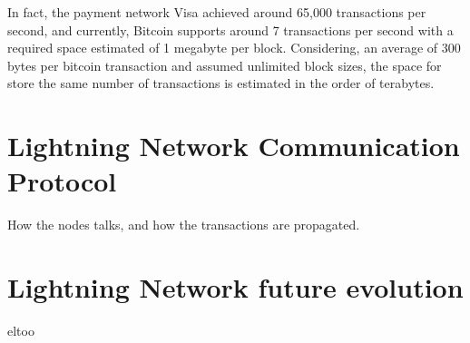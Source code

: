 In fact, the payment network Visa achieved around 65,000\cite{visa-sheet} transactions per second, and currently,
Bitcoin supports around 7 transactions per second with a required space estimated of 1 megabyte per block. Considering,
an average of 300 bytes per bitcoin transaction and assumed unlimited block sizes, the space for store the same number
of transactions is estimated in the order of terabytes\cite{lightning-network-paper}.

\section{Lightning Network Communication Protocol}

How the nodes talks, and how the transactions are propagated.

\section{Lightning Network future evolution}
eltoo